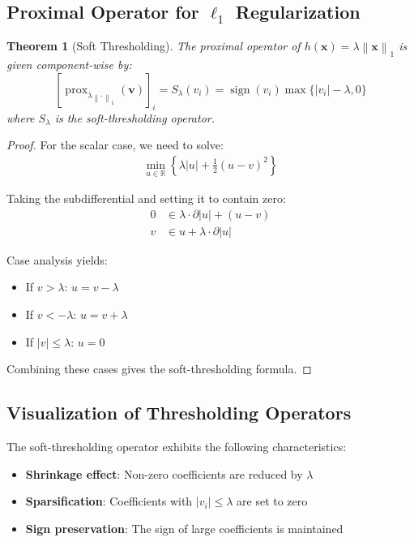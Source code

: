 \documentclass[12pt]{article}
\renewcommand{\vec}[1]{\mathbf{#1}}
\DeclareMathOperator{\prox}{prox}
\DeclareMathOperator{\sign}{sign}
\newcommand{\norm}[1]{\left\lVert#1\right\rVert}
\newcommand{\abs}[1]{\left|#1\right|}
\newcommand{\R}{\mathbb{R}}
\newtheorem{theorem}{Theorem}[section]
\begin{document}
\subsection{Proximal Operator for $\ell_1$ Regularization}

\begin{theorem}[Soft Thresholding]\label{thm:soft-threshold}
    The proximal operator of $h(\vec{x}) = \lambda\norm{\vec{x}}_1$ is given component-wise by:
    \begin{equation}\label{eq:soft-threshold}
        [\prox_{\lambda\norm{\cdot}_1}(\vec{v})]_i = S_\lambda(v_i) = \sign(v_i) \max\{\abs{v_i} - \lambda, 0\}
    \end{equation}
    where $S_\lambda$ is the soft-thresholding operator.
\end{theorem}

\begin{proof}
    For the scalar case, we need to solve:
    \begin{align}
        \min_{u \in \R} \left\{ \lambda\abs{u} + \frac{1}{2}(u - v)^2 \right\}
    \end{align}

    Taking the subdifferential and setting it to contain zero:
    \begin{align}
        0 & \in \lambda \cdot \partial\abs{u} + (u - v) \\
        v & \in u + \lambda \cdot \partial\abs{u}
    \end{align}

    Case analysis yields:
    \begin{itemize}
        \item If $v > \lambda$: $u = v - \lambda$
        \item If $v < -\lambda$: $u = v + \lambda$
        \item If $\abs{v} \leq \lambda$: $u = 0$
    \end{itemize}

    Combining these cases gives the soft-thresholding formula.
\end{proof}

\subsection{Visualization of Thresholding Operators}

The soft-thresholding operator exhibits the following characteristics:
\begin{itemize}
    \item \textbf{Shrinkage effect}: Non-zero coefficients are reduced by $\lambda$
    \item \textbf{Sparsification}: Coefficients with $\abs{v_i} \leq \lambda$ are set to zero
    \item \textbf{Sign preservation}: The sign of large coefficients is maintained
\end{itemize}
\end{document}
